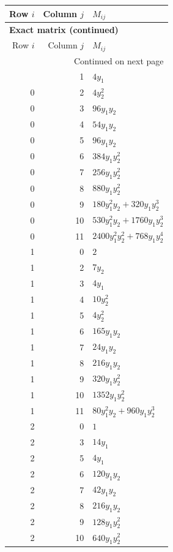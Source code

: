 \documentclass[10pt,a4paper]{article}
\begin{document}
{\small\setlength{\tabcolsep}{7pt}\begin{longtable}{rrp{125mm}}
\toprule Row $i$ & Column $j$ & $M_{ij}$\\\midrule\endfirsthead
\multicolumn{3}{l}{\textbf{Exact matrix (continued)}}\\
\toprule Row $i$ & Column $j$ & $M_{ij}$\\\midrule\endhead
\midrule\multicolumn{3}{r}{Continued on next page}\\\endfoot\bottomrule\endlastfoot
0 & 1 & $4 y_{1}$\\
0 & 2 & $4 y_{2}^{2}$\\
0 & 3 & $96 y_{1} y_{2}$\\
0 & 4 & $54 y_{1} y_{2}$\\
0 & 5 & $96 y_{1} y_{2}$\\
0 & 6 & $384 y_{1} y_{2}^{2}$\\
0 & 7 & $256 y_{1} y_{2}^{2}$\\
0 & 8 & $880 y_{1} y_{2}^{2}$\\
0 & 9 & $180 y_{1}^{2} y_{2} + 320 y_{1} y_{2}^{3}$\\
0 & 10 & $530 y_{1}^{2} y_{2} + 1760 y_{1} y_{2}^{3}$\\
0 & 11 & $2400 y_{1}^{2} y_{2}^{2} + 768 y_{1} y_{2}^{4}$\\
1 & 0 & $2$\\
1 & 2 & $7 y_{2}$\\
1 & 3 & $4 y_{1}$\\
1 & 4 & $10 y_{2}^{2}$\\
1 & 5 & $4 y_{2}^{2}$\\
1 & 6 & $165 y_{1} y_{2}$\\
1 & 7 & $24 y_{1} y_{2}$\\
1 & 8 & $216 y_{1} y_{2}$\\
1 & 9 & $320 y_{1} y_{2}^{2}$\\
1 & 10 & $1352 y_{1} y_{2}^{2}$\\
1 & 11 & $80 y_{1}^{2} y_{2} + 960 y_{1} y_{2}^{3}$\\
2 & 0 & $1$\\
2 & 3 & $14 y_{1}$\\
2 & 5 & $4 y_{1}$\\
2 & 6 & $120 y_{1} y_{2}$\\
2 & 7 & $42 y_{1} y_{2}$\\
2 & 8 & $216 y_{1} y_{2}$\\
2 & 9 & $128 y_{1} y_{2}^{2}$\\
2 & 10 & $640 y_{1} y_{2}^{2}$\\

\end{longtable}}
\end{document}
